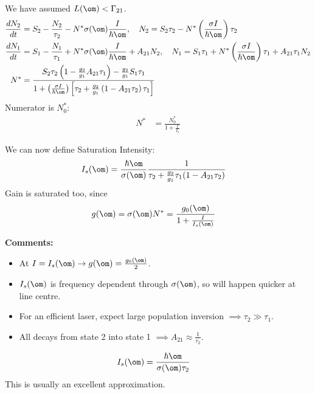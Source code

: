 \documentclass[a4paper, 11pt, normalem]{report}
\begin{document}
We have assumed $L(\om) < \Gamma_{21}$.
\begin{align}
    \frac{dN_2}{dt} &= S_2 - \frac{N_2}{\tau_2} - N^*\sigma(\om)\frac{I}{\hbar\om},\quad  N_2 = S_2\tau_2 - N^*\left(\frac{\sigma I}{\hbar\om}\right)\tau_2 \\
    \frac{dN_1}{dt} &= S_1 - \frac{N_1}{\tau_1} + N^*\sigma(\om)\frac{I}{\hbar\om} + A_{21}N_2,\quad N_1 = S_1\tau_1 + N^*\left(\frac{\sigma I}{\hbar\om}\right)\tau_1 + A_{21}\tau_1N_2 \\
    N^* &= \frac{S_2\tau_2\left(1-\frac{g_2}{g_1}A_{21}\tau_1\right) - \frac{g_2}{g_1}S_1\tau_1}{1+\left(\frac{\sigma I}{\hbar\om}\right)\left[\tau_2+\frac{g_2}{g_1}\left(1-A_{21}\tau_2\right)\tau_1\right]}
\end{align}
Numerator is $N_0^*$:
\begin{align}
    N^* &= \frac{N_0^*}{1 + \frac{I}{I_s}}
\end{align}
\begin{multicols}{2}
We can now define Saturation Intensity:
\begin{align}
    I_s(\om) &= \frac{\hbar\om}{\sigma(\om)}\frac{1}{\tau_2+\frac{g_2}{g_1}\tau_1(1-A_{21}\tau_2)}
\end{align}
Gain is saturated too, since
\begin{align}
    g(\om) &= \sigma(\om)N^* = \frac{g_0(\om)}{1 + \frac{I}{I_s(\om)}}
\end{align}
\end{multicols}
\textbf{Comments:}
\begin{itemize}
    \item At $I = I_s(\om) \to g(\om) = \frac{g_0(\om)}{2}$.
    \item $I_s(\om)$ is frequency dependent through $\sigma(\om)$, so will happen quicker at line centre.
    \item For an efficient laser, expect large population inversion $\implies \tau_2 \gg \tau_1$.
    \item All decays from state 2 into state 1 $\implies A_{21} \approx \frac{1}{\tau_2}$.
\end{itemize}
\begin{align}
    I_s(\om) &= \frac{\hbar\om}{\sigma(\om)\tau_2}
\end{align}
This is usually an excellent approximation.
\end{document}
